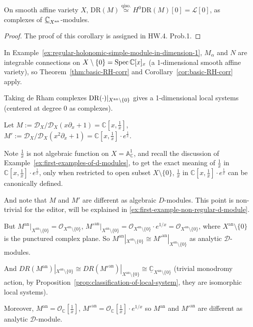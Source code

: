 \begin{corollary}\label{cor:basic-RH-corr}
    On smooth affine variety $X$, $\mathrm{DR}(M)\overset{\text{qiso.}}{\simeq}H^{0}\mathrm{DR}(M)[0] = \mathcal{L}[0]$, as complexes of $\underline{\mathbb{C}}_{X^{\mathrm{an}}}$-modules.
\end{corollary}

\begin{proof}
    The proof of this corollary is assigned in HW.4. Prob.1.
\end{proof}

\begin{remark}
    In Example~\ref{ex:regular-holonomic-simple-module-in-dimension-1},
    $M_\alpha$ and $N$ are integrable connections on $X\setminus \{0\} = \operatorname{Spec} \mathbb{C}[x]_x$ (a 1-dimensional smooth affine variety), so Theorem~\ref{thm:basic-RH-corr} and Corollary~\ref{cor:basic-RH-corr} apply.

    Taking de Rham complexes $\mathrm{DR}(\cdot)|_{X^\mathrm{an}\setminus\{0\}}$ gives a 1-dimensional local systems (centered at degree 0 as complexes).
\end{remark}


\begin{example}
    Let $M := \mathcal{D}_{X} /\mathcal{D}_{X}(x\partial_{x}+1) = \mathbb{C}[x, \frac{1}{x}]$, $M':=\mathcal{D}_{X} /\mathcal{D}_{X}(x^{2}\partial_{x}+1) = \mathbb{C}[x, \frac{1}{x}] \cdot e^{\frac{1}{x}}$.

    Note $\frac{1}{x}$ is not algebraic function on $X=\mathbb{A}^{1}_{\mathbb{C}}$, and recall the discussion of Example~\ref{ex:first-examples-of-d-modules}, to get the exact meaning of $\frac{1}{x}$ in $\mathbb{C}[x, \frac{1}{x}] \cdot e^{\frac{1}{x}}$, only when restricted to open subset $X\setminus \{0\} $, $\frac{1}{x}$ in $\mathbb{C}[x, \frac{1}{x}] \cdot e^{\frac{1}{x}}$ can be canonically defined.

    And note that $M$ and $M'$ are different as algebraic $D$-modules. This point is non-trivial for the editor, will be explained in \ref{ex:first-example-non-regular-d-module}.

    But $M^{\mathrm{an}}|_{X^\mathrm{an}\setminus\{0\}} = \mathcal{O}_{X^\mathrm{an}\setminus\{0\}}$, $M'^{\mathrm{an}}|_{X^\mathrm{an}\setminus\{0\}}=\mathcal{O}_{X^\mathrm{an}\setminus\{0\}}\cdot e^{1/x}=\mathcal{O}_{X^\mathrm{an}\setminus\{0\}}$,
    where $X^\mathrm{an}\setminus\{0\}$ is the punctured complex plane.
    So $M^{\mathrm{an}}|_{X^\mathrm{an}\setminus\{0\}} \cong M'^{\mathrm{an}}|_{X^\mathrm{an}\setminus\{0\}}$ as analytic $\mathcal{D}$-modules.

    And $DR(M^{\mathrm{an}})|_{X^\mathrm{an}\setminus\{0\}} \cong DR(M'^{\mathrm{an}})|_{X^\mathrm{an}\setminus\{0\}} \cong \underline{\mathbb{C}}_{X^\mathrm{an}\setminus\{0\}}$ (trivial monodromy action, by Proposition~\ref{prop:classification-of-local-system}, they are isomorphic local systems).

    Moreover, $M^{\mathrm{an}} = \mathcal{O}_{\mathbb{C}}[\frac{1}{x}]$, $M'^{\mathrm{an}}=\mathcal{O}_{\mathbb{C}}[\frac{1}{x}]\cdot e^{1/x}$
    so $M^{\mathrm{an}}$ and $M'^{\mathrm{an}}$ are different as analytic $\mathcal{D}$-module.
\end{example}

